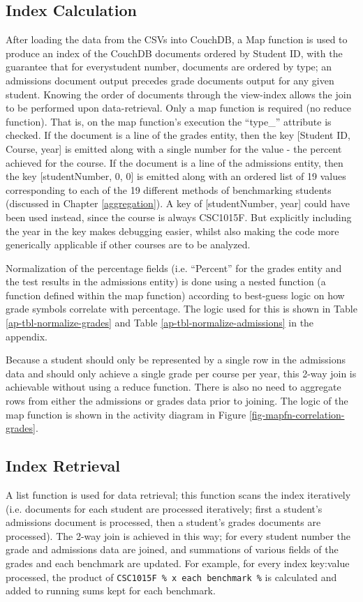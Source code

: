 \subsection{Index Calculation}
After loading the data from the CSVs into CouchDB, a Map function is used to produce an index of the CouchDB documents ordered by Student ID, with the guarantee that for everystudent number, documents are ordered by type; an admissions document output precedes grade documents output for any given student. Knowing the order of documents through the view-index allows the join to be performed upon data-retrieval. Only a map function is required (no reduce function). That is, on the map function’s execution the ``type\_'' attribute is checked. If the document is a line of the grades entity, then the key [Student ID, Course, year] is emitted along with a single number for the value - the percent achieved for the course. If the document is a line of the admissions entity, then the key [studentNumber, 0, 0] is emitted along with an ordered list of 19 values corresponding to each of the 19 different methods of benchmarking students (discussed in Chapter \ref{aggregation}). A key of [studentNumber, year] could have been used instead, since the course is always CSC1015F. But explicitly including the year in the key makes debugging easier, whilst also making the code more generically applicable if other courses are to be analyzed.

Normalization of the percentage fields (i.e. ``Percent'' for the grades entity and the test results in the admissions entity) is done using a nested function (a function defined within the map function) according to best-guess logic on how grade symbols correlate with percentage. The logic used for this is shown in Table \ref{ap-tbl-normalize-grades} and Table \ref{ap-tbl-normalize-admissions} in the appendix.

Because a student should only be represented by a single row in the admissions data and should only achieve a single grade per course per year, this 2-way join is achievable without using a reduce function. There is also no need to aggregate rows from either the admissions or grades data prior to joining. The logic of the map function is shown in the activity diagram in Figure \ref{fig-mapfn-correlation-grades}.



\subsection{Index Retrieval}
A list function is used for data retrieval; this function scans the index iteratively (i.e. documents for each student are processed iteratively; first a student's admissions document is processed, then a student's grades documents are processed). The 2-way join is achieved in this way; for every student number the grade and admissions data are joined, and summations of various fields of the grades and each benchmark are updated. For example, for every index key:value processed, the product of \texttt{CSC1015F \% x each benchmark \%} is calculated and added to running sums kept for each benchmark.

